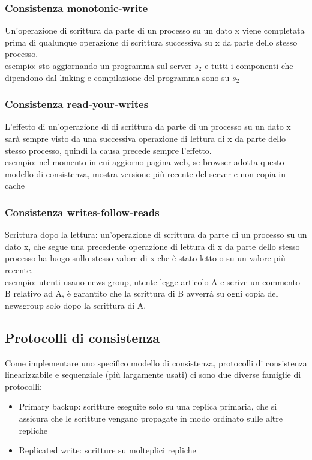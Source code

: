\documentclass[16px]{article}
\begin{document}
\subsubsection{Consistenza monotonic-write}
Un'operazione di scrittura da parte di un processo su un dato x viene completata prima di qualunque operazione di scrittura successiva su x da parte dello stesso processo.\\ esempio: sto aggiornando un programma sul server $s_2$ e tutti i componenti che dipendono dal linking e compilazione del programma sono su $s_2$
\subsubsection{Consistenza read-your-writes}
L'effetto di un'operazione di di scrittura da parte di un processo su un dato x sarà sempre visto da una successiva operazione di lettura di x da parte dello stesso processo, quindi la causa precede sempre l'effetto.\\ esempio: nel momento in cui aggiorno pagina web, se browser adotta questo modello di consistenza, mostra versione più recente del server e non copia in cache
\subsubsection{Consistenza writes-follow-reads}
Scrittura dopo la lettura: un'operazione di scrittura da parte di un processo su un dato x, che segue una precedente operazione di lettura di x da parte dello stesso processo ha luogo sullo stesso valore di x che è stato letto o su un valore più recente.\\ esempio: utenti usano news group, utente legge articolo A e scrive un commento B relativo ad A, è garantito che la scrittura di B avverrà su ogni copia del newsgroup solo dopo la scrittura di A.
\subsection{Protocolli di consistenza}
Come implementare uno specifico modello di consistenza, protocolli di consistenza linearizzabile e sequenziale (più largamente usati) ci sono due diverse famiglie di protocolli:
\begin{itemize}
\item Primary backup: scritture eseguite solo su una replica primaria, che si assicura che le scritture vengano propagate in modo ordinato sulle altre repliche
\item Replicated write: scritture su molteplici repliche
\end{itemize}
\end{document}
